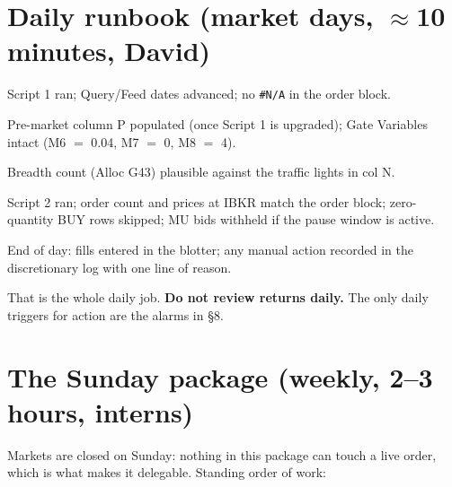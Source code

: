 \documentclass[11pt,a4paper]{article}
\begin{document}
\section{Daily runbook (market days, $\approx$10 minutes, David)}

\begin{checklist}
\item Script 1 ran; Query/Feed dates advanced; no \texttt{\#N/A} in the order block.
\item Pre-market column P populated (once Script 1 is upgraded); Gate
      Variables intact (M6 $=$ 0.04, M7 $=$ 0, M8 $=$ 4).
\item Breadth count (Alloc G43) plausible against the traffic lights in col N.
\item Script 2 ran; order count and prices at IBKR match the order block;
      zero-quantity BUY rows skipped; MU bids withheld if the pause window is
      active.
\item End of day: fills entered in the blotter; any manual action recorded in
      the discretionary log with one line of reason.
\end{checklist}

That is the whole daily job. \textbf{Do not review returns daily.} The only
daily triggers for action are the alarms in \S8.

\section{The Sunday package (weekly, 2--3 hours, interns)}

Markets are closed on Sunday: nothing in this package can touch a live order,
which is what makes it delegable. Standing order of work:
\end{document}
